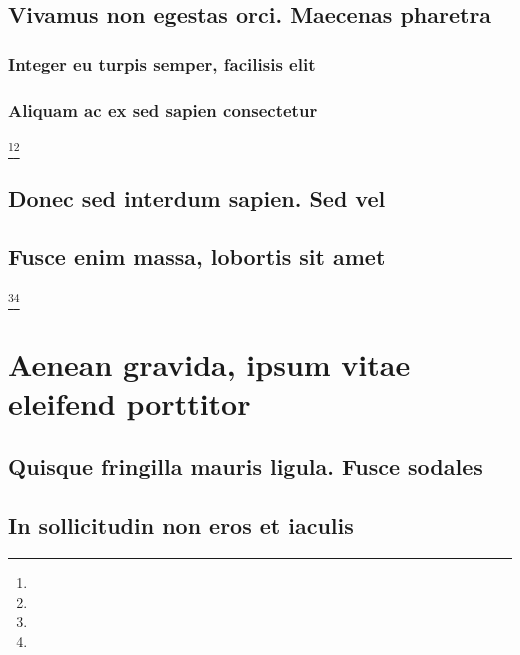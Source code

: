 \documentclass[%
  german,%
  exercise,%
  oneside,%
]{iswartcl}
\begin{document}
\lipsum[1-8]

\subsection{Vivamus non egestas orci. Maecenas pharetra}

\lipsum[1-8]

\subsubsection{Integer eu turpis semper, facilisis elit}

\lipsum[1-8]

\subsubsection{Aliquam ac ex sed sapien consectetur}

\lipsum[1-8]\footnote{\lipsum[1]}\footnote{\lipsum[1]}

\subsection{Donec sed interdum sapien. Sed vel}

\lipsum[1-8]

\subsection{Fusce enim massa, lobortis sit amet}

\lipsum[1-8]\footnote{\lipsum[1]}\footnote{\lipsum[1]}

\section{Aenean gravida, ipsum vitae eleifend porttitor}

\lipsum[1-8]

\subsection{Quisque fringilla mauris ligula. Fusce sodales}

\lipsum[1-8]

\subsection{In sollicitudin non eros et iaculis}

\lipsum[1-8]
\end{document}
